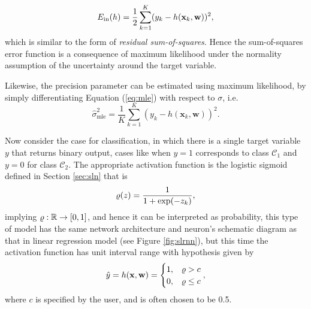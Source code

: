 \begin{equation}
\label{eq:regin}
E_{\mathrm{in}}(h)=\frac{1}{2}\sum_{k=1}^K(y_k-h(\mathbf{x}_k,\mathbf{w}))^2,
\end{equation}
which is similar to the form of \textit{residual sum-of-squares}. Hence the sum-of-squares error function is a consequence of maximum likelihood under the normality assumption of the uncertainty around the target variable.

Likewise, the precision parameter can be estimated using maximum likelihood, by simply differentiating Equation (\ref{eq:mle}) with respect to $\sigma$, i.e.
$$
\hat{\sigma}_{\mathrm{mle}}^2=\frac{1}{K}\sum_{k=1}^K(y_k-h(\mathbf{x}_k,\mathbf{w}))^2.
$$

Now consider the case for classification, in which there is a single target variable $y$ that returns binary output, cases like when $y=1$ corresponds to class $\mathcal{C}_1$ and $y=0$ for class $\mathcal{C}_2$. The appropriate activation function is the logistic sigmoid defined in Section \ref{sec:sln} that is 
$$
\varrho(z)=\frac{1}{1+\exp(-z_k)},
$$
implying $\varrho:\mathbb{R}\to[0,1]$, and hence it can be interpreted as probability, this type of model has the same network architecture and neuron's schematic diagram as that in linear regression model (see Figure \ref{fig:slrnn}), but this time the activation function has unit interval range with hypothesis given by
$$\hat{y}=h(\mathbf{x},\mathbf{w})=\begin{cases}
1,&\varrho>c\\
0,&\varrho\leq c
\end{cases},$$
where $c$ is specified by the user, and is often chosen to be 0.5. 

